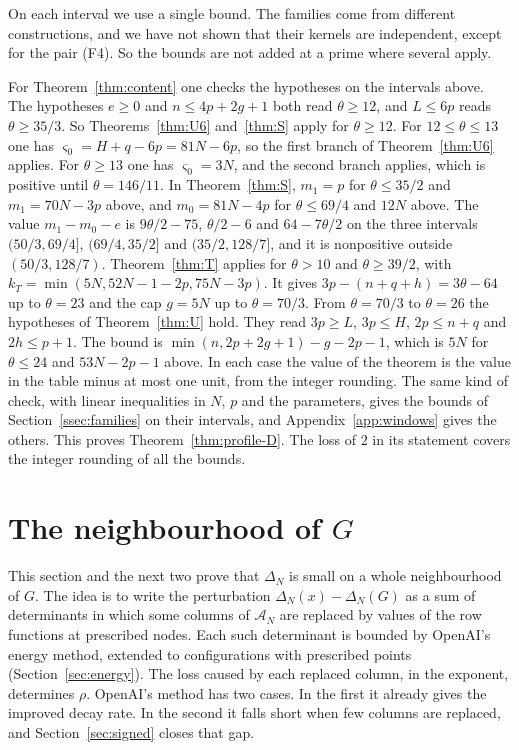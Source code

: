 \documentclass[11pt]{amsart}
\theoremstyle{definition}
\theoremstyle{remark}
\numberwithin{equation}{section}
\newcommand{\cA}{\mathcal A}
\begin{document}
On each interval we use a single bound. The families come from different constructions, and we have not
shown that their kernels are independent, except for the pair (F4). So the bounds are not added at a prime
where several apply.

For Theorem~\ref{thm:content} one checks the hypotheses on the intervals above. The hypotheses $e\ge0$ and
$n\le4p+2g+1$ both read $\theta\ge12$, and $L\le6p$ reads $\theta\ge35/3$. So Theorems~\ref{thm:U6}
and~\ref{thm:S} apply for $\theta\ge12$. For $12\le\theta\le13$ one has $\varsigma_0=H+q-6p=81N-6p$, so the
first branch of Theorem~\ref{thm:U6} applies. For $\theta\ge13$ one has $\varsigma_0=3N$, and the second
branch applies, which is positive until $\theta=146/11$. In Theorem~\ref{thm:S}, $m_1=p$ for $\theta\le35/2$ and
$m_1=70N-3p$ above, and $m_0=81N-4p$ for $\theta\le69/4$ and $12N$ above. The value $m_1-m_0-e$ is
$9\theta/2-75$, $\theta/2-6$ and $64-7\theta/2$ on the three intervals $(50/3,69/4]$, $(69/4,35/2]$ and
$(35/2,128/7]$, and it is nonpositive outside $(50/3,128/7)$. Theorem~\ref{thm:T} applies for $\theta>10$ and
$\theta\ge39/2$, with $k_T=\min(5N,52N-1-2p,75N-3p)$. It gives $3p-(n+q+h)=3\theta-64$ up to $\theta=23$ and
the cap $g=5N$ up to $\theta=70/3$. From $\theta=70/3$ to $\theta=26$ the hypotheses of Theorem~\ref{thm:U}
hold. They read $3p\ge L$, $3p\le H$, $2p\le n+q$ and $2h\le p+1$. The bound is $\min(n,2p+2g+1)-g-2p-1$,
which is $5N$ for $\theta\le24$ and $53N-2p-1$ above. In each case the value of the theorem is the value in
the table minus at most one unit, from the integer rounding. The same kind of check, with linear
inequalities in $N$, $p$ and the parameters, gives the bounds of Section~\ref{ssec:families} on their
intervals, and Appendix~\ref{app:windows} gives the others. This proves Theorem~\ref{thm:profile-D}. The loss
of $2$ in its statement covers the integer rounding of all the bounds.
\section{The neighbourhood of $G$}\label{sec:real}

This section and the next two prove that $\Delta_N$ is small on a whole neighbourhood of $G$. The idea is to
write the perturbation $\Delta_N(x)-\Delta_N(G)$ as a sum of determinants in which some columns of $\cA_N$
are replaced by values of the row functions at prescribed nodes. Each such determinant is bounded by
OpenAI's energy method, extended to configurations with prescribed points (Section~\ref{sec:energy}). The
loss caused by each replaced column, in the exponent, determines $\rho$. OpenAI's method has two cases. In
the first it already gives the improved decay rate. In the second it falls short when few columns are
replaced, and Section~\ref{sec:signed} closes that gap.
\end{document}
